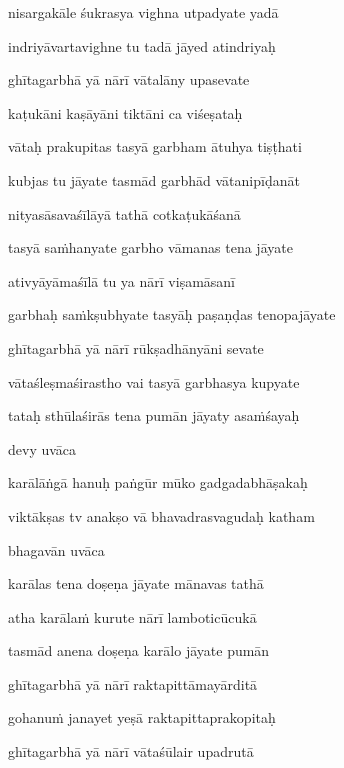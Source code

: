 nisargakāle śukrasya vighna utpadyate yadā \veg\dontdisplaylinenum

indriyāvartavighne tu tadā jāyed atindriyaḥ\thinspace{\dandab} \dontdisplaylinenum 

ghītagarbhā yā nārī vātalāny upasevate \veg\dontdisplaylinenum

kaṭukāni kaṣāyāni tiktāni ca viśeṣataḥ\thinspace{\dandab} \dontdisplaylinenum

vātaḥ prakupitas tasyā garbham ātuhya tiṣṭhati \veg\dontdisplaylinenum

kubjas tu jāyate tasmād garbhād vātanipīḍanāt\thinspace{\dandab} \dontdisplaylinenum

nityasāsavaśīlāyā tathā cotkaṭukāśanā \veg\dontdisplaylinenum

tasyā saṁhanyate garbho vāmanas tena jāyate\thinspace{\dandab} \dontdisplaylinenum

ativyāyāmaśīlā tu ya nārī viṣamāsanī \veg\dontdisplaylinenum

garbhaḥ saṁkṣubhyate tasyāḥ paṣaṇḍas tenopajāyate\thinspace{\dandab} \dontdisplaylinenum

ghītagarbhā yā nārī rūkṣadhānyāni sevate \veg\dontdisplaylinenum

vātaśleṣmaśirastho vai tasyā garbhasya kupyate\thinspace{\dandab} \dontdisplaylinenum

tataḥ sthūlaśirās tena pumān jāyaty asaṁśayaḥ \veg\dontdisplaylinenum

devy uvāca~{\dandab}\dontdisplaylinenum 

karālāṅgā hanuḥ paṅgūr mūko gadgadabhāṣakaḥ\thinspace{\danda} \dontdisplaylinenum

viktākṣas tv anakṣo vā bhavadrasvagudaḥ katham \veg\dontdisplaylinenum

bhagavān uvāca~{\dandab}\dontdisplaylinenum 

karālas tena doṣeṇa jāyate mānavas tathā\thinspace{\danda} \dontdisplaylinenum

atha karālaṁ kurute nārī lamboticūcukā \danda\dontdisplaylinenum

tasmād anena doṣeṇa karālo jāyate pumān \veg\dontdisplaylinenum

ghītagarbhā yā nārī raktapittāmayārditā\thinspace{\dandab} \dontdisplaylinenum

gohanuṁ janayet yeṣā raktapittaprakopitaḥ \veg\dontdisplaylinenum

ghītagarbhā yā nārī vātaśūlair upadrutā\thinspace{\dandab} \dontdisplaylinenum

